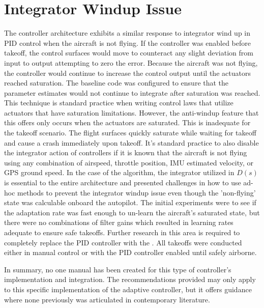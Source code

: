 \section{Integrator Windup Issue}
The \Lone controller architecture exhibits a similar response to integrator wind up in \ac{PID} control when the aircraft is not flying.  If the controller was enabled before takeoff, the control surfaces would move to counteract any slight deviation from input to output attempting to zero the error. Because the aircraft was not flying, the controller would continue to increase the control output until the actuators reached saturation.  The baseline code was configured to ensure that the parameter estimates would not continue to integrate after saturation was reached.  This technique is standard practice when writing control laws that utilize actuators that have saturation limitations.  However, the anti-windup feature that this offers only occurs when the actuators are saturated.  This is inadequate for the takeoff scenario.  The flight surfaces quickly saturate while waiting for takeoff and cause a crash immediately upon takeoff.  It's standard practice to also disable the integrator action of controllers if it is known that the aircraft is not flying using any combination of airspeed, throttle position, \ac{IMU} estimated velocity, or \ac{GPS} ground speed.  In the case of the \Lone algorithm, the integrator utilized in $D(s)$ is essential to the entire architecture and presented challenges in how to use ad-hoc methods to prevent the integrator windup issue even though the 'non-flying' state was calculable onboard the autopilot.  The initial experiments were to see if the adaptation rate was fast enough to un-learn the aircraft's saturated state, but there were no combinations of filter gains which resulted in learning rates adequate to ensure safe takeoffs.  Further research in this area is required to completely replace the \ac{PID} controller with the \Lone.  All takeoffs were conducted either in manual control or with the \ac{PID} controller enabled until safely airborne.

In summary, no one manual has been created for this type of controller's implementation and integration.  The recommendations provided may only apply to this specific implementation of the \Lone adaptive controller, but it offers guidance where none previously was articulated in contemporary literature.
